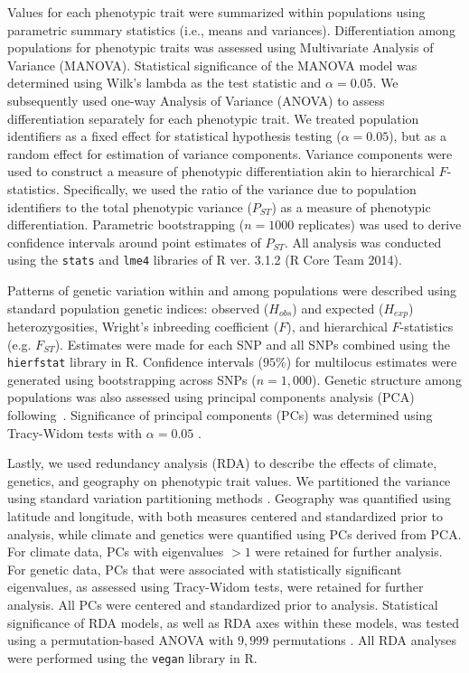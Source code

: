 \documentclass[smallextended]{svjour3}
\begin{document}
Values for each phenotypic trait were summarized  within populations using
parametric summary statistics (i.e., means and variances). Differentiation among
populations for phenotypic traits was assessed using Multivariate Analysis of
Variance (MANOVA). Statistical significance of the MANOVA model was determined
using Wilk's lambda as the test statistic and $\alpha = 0.05$. We subsequently
used one-way Analysis of Variance (ANOVA) to assess differentiation separately
for each phenotypic trait. We treated population identifiers as a fixed effect
for statistical hypothesis testing ($\alpha = 0.05$), but as a random effect for
estimation of variance components. Variance components were used to construct a
measure of phenotypic differentiation akin to hierarchical $F$-statistics.
Specifically, we used the ratio of the variance due to population identifiers to
the total phenotypic variance ($P_{ST}$) as a measure of phenotypic
differentiation. Parametric bootstrapping ($n = 1000$ replicates) was used
to derive confidence intervals around point estimates of $P_{ST}$. All analysis
was conducted using the \texttt{stats} and
\texttt{lme4} libraries of R ver. 3.1.2 (R Core Team 2014).

Patterns of genetic variation within and among populations were described using
standard population genetic indices: observed ($H_{obs}$) and expected
($H_{exp}$) heterozygosities, Wright's inbreeding coefficient ($F$), and
hierarchical $F$-statistics (e.g. $F_{ST}$). Estimates were made for each SNP
and all SNPs combined using the \texttt{hierfstat} library in R. Confidence
intervals ($95\%$) for multilocus estimates were generated using bootstrapping
across SNPs ($n = 1,000$). Genetic structure among populations was also assessed
using principal components analysis (PCA) following~\cite{Patterson:2006}.
Significance of principal components (PCs) was determined using Tracy-Widom
tests with $\alpha = 0.05$ \citep{Patterson:2006}.

Lastly, we used redundancy analysis (RDA) to describe the effects of climate,
genetics, and geography on phenotypic trait values. We partitioned the variance
using standard variation partitioning methods \citep{Borcard:1992, Liu:1997}.
Geography was quantified using latitude and longitude, with both measures
centered and standardized prior to analysis, while climate and genetics were
quantified using PCs derived from PCA. For climate data, PCs with eigenvalues
$> 1$ were retained for further analysis. For genetic data, PCs that were
associated with statistically significant eigenvalues, as assessed using
Tracy-Widom tests, were retained for further analysis. All PCs were
centered and standardized prior to analysis. Statistical significance
of RDA models, as well as RDA axes within these models, was tested using
a permutation-based ANOVA with $9,999$ permutations \citep{Legendre:2011}. All
RDA analyses were performed using the \texttt{vegan} library in R. 
\end{document}
